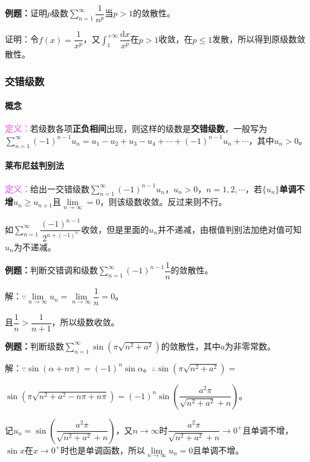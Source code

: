 \textbf{例题：}证明$p$级数$\sum\limits_{n=1}^\infty\dfrac{1}{n^p}$当$p>1$的敛散性。

证明：令$f(x)=\dfrac{1}{x^p}$，又$\int_1^{+\infty}\dfrac{\textrm{d}x}{x^p}$在$p>1$收敛，在$p\leqslant1$发散，所以得到原级数敛散性。

\subsubsection{交错级数}

\paragraph{概念} \leavevmode \medskip

\textcolor{violet}{\textbf{定义：}}若级数各项\textbf{正负相间}出现，则这样的级数是\textbf{交错级数}，一般写为$\sum\limits_{n=1}^\infty(-1)^{n-1}u_n=u_1-u_2+u_3-u_4+\cdots+(-1)^{n-1}u_n+\cdots$，其中$u_n>0$。

\paragraph{莱布尼兹判别法} \leavevmode \medskip

\textcolor{violet}{\textbf{定义：}}给出一交错级数$\sum\limits_{n=1}^\infty(-1)^{n-1}u_n$，$u_n>0$，$n=1,2,\cdots$，若$\{u_n\}$\textbf{单调不增}$u_n\geqslant u_{n+1}$且$\lim\limits_{n\to\infty}=0$，则该级数收敛。反过来则不行。

如$\sum\limits_{n=1}^\infty\dfrac{(-1)^{n-1}}{2^{n+(-1)^n}}$收敛，但是里面的$u_n$并不递减，由根值判别法加绝对值可知$u_n$为不递减。

\textbf{例题：}判断交错调和级数$\sum\limits_{n=1}^\infty(-1)^{n-1}\dfrac{1}{n}$的敛散性。

解：$\because\lim\limits_{n\to\infty}u_n=\lim\limits_{n\to\infty}\dfrac{1}{n}=0$。

且$\dfrac{1}{n}>\dfrac{1}{n+1}$，所以级数收敛。

\textbf{例题：}判断级数$\sum\limits_{n=1}^\infty\sin(\pi\sqrt{n^2+a^2})$的敛散性，其中$a$为非零常数。

解：$\because\sin(\alpha+n\pi)=(-1)^n\sin\alpha$。$\therefore\sin(\pi\sqrt{n^2+a^2})=$

$\sin(\pi\sqrt{n^2+a^2-n\pi+n\pi})=(-1)^n\sin\left(\dfrac{a^2\pi}{\sqrt{n^2+a^2}+n}\right)$。

记$u_n=\sin\left(\dfrac{a^2\pi}{\sqrt{n^2+a^2}+n}\right)$，又$n\to\infty$时$\dfrac{a^2\pi}{\sqrt{n^2+a^2}+n}\to0^+$且单调不增，$\sin x$在$x\to0^+$时也是单调函数，所以$\lim\limits_{n\to\infty}u_n=0$且单调不增。

